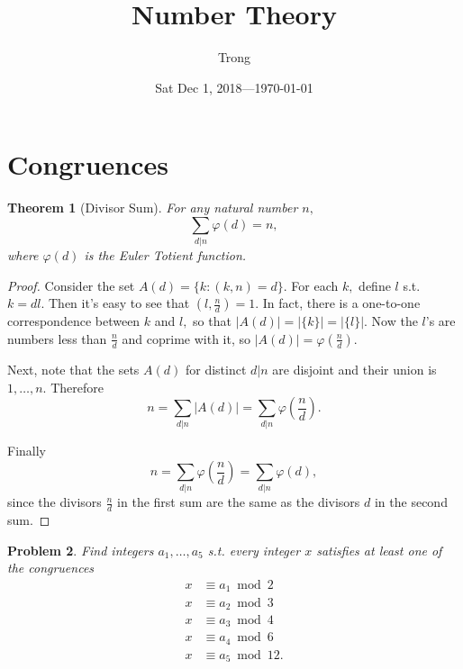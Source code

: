 \documentclass[17pt]{extarticle}
\title{Number Theory}
\author{Trong}
\date{Sat Dec 1, 2018---\today}
\theoremstyle{plain}
\newtheorem{theorem}{Theorem}
\newtheorem{problem}[theorem]{Problem}
\theoremstyle{definition}
\theoremstyle{remark}
\newcommand{\0}{\varnothing}
\newcommand{\f}{\varphi}
\newcommand{\<}{\langle}
\renewcommand{\>}{\rangle}
\begin{document}
\sloppy
\maketitle
\tableofcontents %
\pagebreak

\section{Congruences}

\begin{theorem}[Divisor Sum]
  For any natural number $ n, $
\[
\sum _ { d | n } \f ( d ) = n,
\]
where \( \f(d) \) is the Euler Totient function.
\end{theorem}

\begin{proof}
Consider the set \( A(d) = \{ k: (k, n) = d \}. \) For each \( k, \) define \( l \) s.t. \( k = dl. \) Then it's easy to see that \( (l, \frac{n}{d}) = 1. \) In fact, there is a one-to-one correspondence between \( k \) and \( l, \) so that \( | A(d) | = | \{ k \} | = | \{ l \} |. \) Now the \( l \)'s are numbers less than \( \frac{n}{d} \) and coprime with it, so \( | A(d) | = \f(\frac{n}{d}). \)

Next, note that the sets \( A(d) \) for distinct \( d|n \) are disjoint and their union is \( {1, \ldots, n}. \) Therefore
\[
n = \sum_{d|n} |A(d)| = \sum_{d|n} \f\left(\frac{n}{d}\right).
\]

Finally
\[
n = \sum_{d|n} \f\left(\frac{n}{d}\right) = \sum_{d|n} \f(d),
\]
since the divisors \( \frac{n}{d} \) in the first sum are the same as the divisors \( d \) in the second sum.
\end{proof}

\begin{problem}
Find integers $ a_1, \ldots, a_5 $ s.t. every integer $ x $ satisfies at least one of the congruences \begin{align*}
  x &\equiv a_1 \bmod 2 \\
  x &\equiv a_2 \bmod 3 \\
  x &\equiv a_3 \bmod 4 \\
  x &\equiv a_4 \bmod 6 \\
  x &\equiv a_5 \bmod 12. \tag{$ * $}
\end{align*}
\end{problem}
\end{document}
